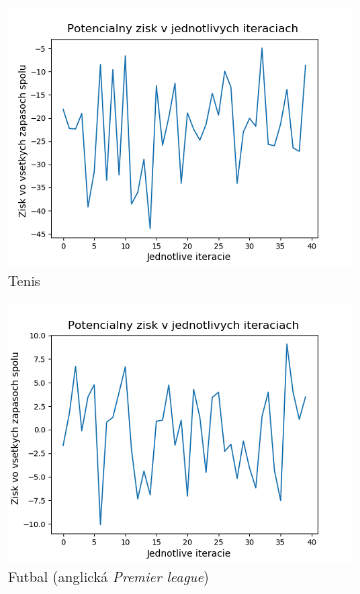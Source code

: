 \begin{figure}[h!]
  \begin{subfigure}[b]{0.48\textwidth}
    \includegraphics[width=\textwidth]{../img/rnn_tenis_prof.png} 
    \caption{Tenis} 
  \end{subfigure} 
  \begin{subfigure}[b]{0.48\textwidth}
    \includegraphics[width=\textwidth]{../img/rnn_eng_prof.png} 
    \caption{Futbal (anglická \textit{Premier league})} 
  \end{subfigure} 
  \begin{subfigure}[b]{0.48\textwidth}

\end{subfigure}
\end{figure}
